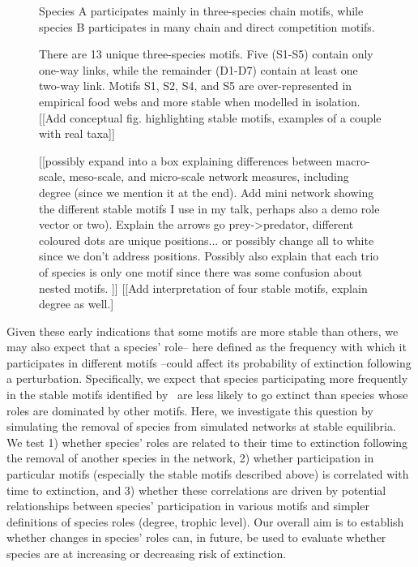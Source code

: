 \documentclass[12pt]{article}
\begin{document}
\begin{figure}[hb!]
{        Species A participates mainly in three-species chain motifs, while species B participates in many chain and direct competition motifs. 
        
        There are 13 unique three-species motifs. Five (S1-S5) contain only one-way links, while the remainder (D1-D7) contain at least one two-way link. Motifs S1, S2, S4, and S5 are over-represented in empirical food webs and more stable when modelled in isolation. [[Add conceptual fig. highlighting stable motifs, examples of a couple with real taxa]]}
        [[possibly expand into a box explaining differences between macro-scale, meso-scale, and micro-scale network measures, including degree (since we mention it at the end). Add mini network showing the different stable motifs I use in my talk, perhaps also a demo role vector or two). Explain the arrows go prey->predator, different coloured dots are unique positions... or possibly change all to white since we don't address positions. Possibly also explain that each trio of species is only one motif since there was some confusion about nested motifs. ]]
        [[Add interpretation of four stable motifs, explain degree as well.]
        \label{motifs}
    \end{figure}


	Given these early indications that some motifs are more stable than others, we may also expect that a species' role-- here defined as the frequency with which it participates in different motifs --could affect its probability of extinction following a perturbation. Specifically, we expect that species participating more frequently in the stable motifs identified by~\citet{Borrelli2015a} are less likely to go extinct than species whose roles are dominated by other motifs. Here, we investigate this question by simulating the removal of species from simulated networks at stable equilibria. We test 1) whether species' roles are related to their time to extinction following the removal of another species in the network, 2) whether participation in particular motifs (especially the stable motifs described above) is correlated with time to extinction, and 3) whether these correlations are driven by potential relationships between species' participation in various motifs and simpler definitions of species roles (degree, trophic level). Our overall aim is to establish whether changes in species' roles can, in future, be used to evaluate whether species are at increasing or decreasing risk of extinction.


\end{document}
